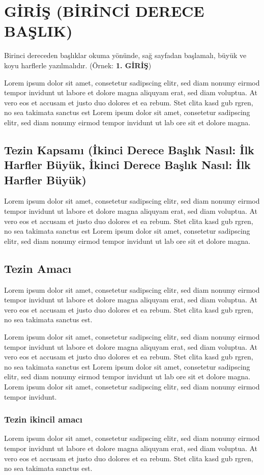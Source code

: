 \chapter{GİRİŞ (BİRİNCİ DERECE BAŞLIK)}
Birinci dereceden başlıklar okuma yönünde, sağ sayfadan başlamalı, büyük ve koyu harflerle yazılmalıdır. (Örnek: \textbf{1. GİRİŞ})

Lorem ipsum dolor sit amet, consetetur sadipscing elitr, sed diam nonumy eirmod tempor invidunt ut labore et dolore magna aliquyam erat, sed diam voluptua. At vero eos et accusam et justo duo dolores et ea rebum. Stet clita kasd gub rgren, no sea takimata sanctus est Lorem ipsum dolor sit amet, consetetur sadipscing elitr, sed diam nonumy eirmod tempor invidunt ut lab ore sit et dolore magna.

\section{Tezin Kapsamı (İkinci Derece Başlık Nasıl: İlk Harfler Büyük, İkinci Derece Başlık Nasıl: İlk Harfler Büyük)}
Lorem ipsum dolor sit amet, consetetur sadipscing elitr, sed diam nonumy eirmod tempor invidunt ut labore et dolore magna aliquyam erat, sed diam voluptua. At vero eos et accusam et justo duo dolores et ea rebum. Stet clita kasd gub rgren, no sea takimata sanctus est Lorem ipsum dolor sit amet, consetetur sadipscing elitr, sed diam nonumy eirmod tempor invidunt ut lab ore sit et dolore magna.

\section{Tezin Amacı}
Lorem ipsum dolor sit amet, consetetur sadipscing elitr, sed diam nonumy eirmod tempor invidunt ut labore et dolore magna aliquyam erat, sed diam voluptua. At vero eos et accusam et justo duo dolores et ea rebum. Stet clita kasd gub rgren, no sea takimata sanctus est.

Lorem ipsum dolor sit amet, consetetur sadipscing elitr, sed diam nonumy eirmod tempor invidunt ut labore et dolore magna aliquyam erat, sed diam voluptua. At vero eos et accusam et justo duo dolores et ea rebum. Stet clita kasd gub rgren, no sea takimata sanctus est Lorem ipsum dolor sit amet, consetetur sadipscing elitr, sed diam nonumy eirmod tempor invidunt ut lab ore sit et dolore magna. Lorem ipsum dolor sit amet, consetetur sadipscing elitr, sed diam nonumy eirmod tempor invidunt.

\subsection{Tezin ikincil amacı}
Lorem ipsum dolor sit amet, consetetur sadipscing elitr, sed diam nonumy eirmod tempor invidunt ut labore et dolore magna aliquyam erat, sed diam voluptua. At vero eos et accusam et justo duo dolores et ea rebum. Stet clita kasd gub rgren, no sea takimata sanctus est.

